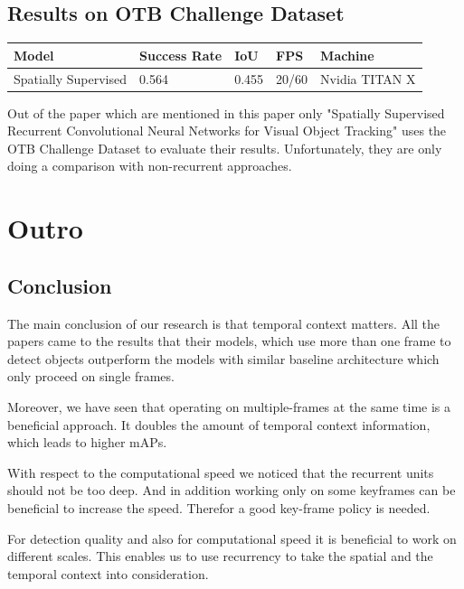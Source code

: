 \documentclass[conference]{IEEEtran}
\begin{document}
\subsection{Results on OTB Challenge Dataset}
\begin{tabular}{ | p{2cm} | p{3em}| p{2em} | p{4em} | p{4em} | } 
 \hline
 Model & Success Rate & IoU & FPS & Machine \\
 \hline
 Spatially Supervised \cite{b5} & 0.564 & 0.455 & 20/60 & Nvidia TITAN X \\
 \hline
\end{tabular} \newline

Out of the paper which are mentioned in this paper only "Spatially Supervised Recurrent Convolutional Neural Networks for Visual Object Tracking" uses the OTB Challenge Dataset to evaluate their results. Unfortunately, they are only doing a comparison with non-recurrent approaches. 

\section{Outro}

\subsection{Conclusion}
The main conclusion of our research is that temporal context matters. All the papers came to the results that their models, which use more than one frame to detect objects outperform the models with similar baseline architecture which only proceed on single frames. \newline

Moreover, we have seen that operating on multiple-frames at the same time is a beneficial approach. It doubles the amount of temporal context information, which leads to higher mAPs. \newline

With respect to the computational speed we noticed that the recurrent units should not be too deep. And in addition working only on some keyframes can be beneficial to increase the speed. Therefor a good key-frame policy is needed. \newline

For detection quality and also for computational speed it is beneficial to work on different scales. This enables us to use recurrency to take the spatial and the temporal context into consideration. 
\end{document}
